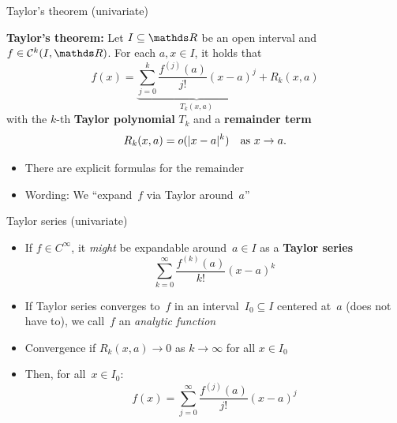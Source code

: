 \documentclass[11pt,compress,t,notes=noshow, xcolor=table]{beamer}
\begin{document}
\begin{vbframe}{Taylor's theorem (univariate)}


\textbf{Taylor's theorem:} Let $I \subseteq \R$ be an open interval and $f \in \mathcal{C}^k(I,\R)$.
For each $a,x \in I$, it holds that
\begin{equation*}
    f(x) = \underbrace{\sum_{j=0}^{k} \frac{f^{(j)}(a)}{j!}(x-a)^{j}}_{T_k(x,a)} + R_k(x,a)
\end{equation*}
with the $k$-th \textbf{Taylor polynomial} $T_{k}$ and a \textbf{remainder term}
\begin{equation*}
    R_k(x, a) = {o}(|x-a|^k) \quad\textnormal{as~$x \to a$}.
\end{equation*}


\begin{itemize}
    \item There are explicit formulas for the remainder
    \item Wording: We \enquote{expand~$f$ via Taylor around~$a$}
\end{itemize}

\end{vbframe}

\begin{vbframe}{Taylor series (univariate)}

\begin{itemize}
    \item If $f \in C^\infty$, it \textit{might} be expandable around~$a \in I$ as a \textbf{Taylor series}
        \begin{equation*}
            \sum_{k=0}^{\infty} \frac{f^{(k)}(a)}{k!}(x-a)^{k}
        \end{equation*}
    \item If Taylor series converges to~$f$ in an interval~$I_0 \subseteq I$ centered at~$a$ (does not have to), we call~$f$ an \textit{analytic function}
    \item Convergence if $R_k(x, a) \rightarrow 0$ as $k \rightarrow \infty$ for all $x \in I_0$
    \item Then, for all~$x \in I_0$:
        \begin{equation*}
            f(x) = \sum_{j=0}^{\infty} \frac{f^{(j)}(a)}{j!}(x-a)^{j}
        \end{equation*}
\end{itemize}

\end{vbframe}
\end{document}
